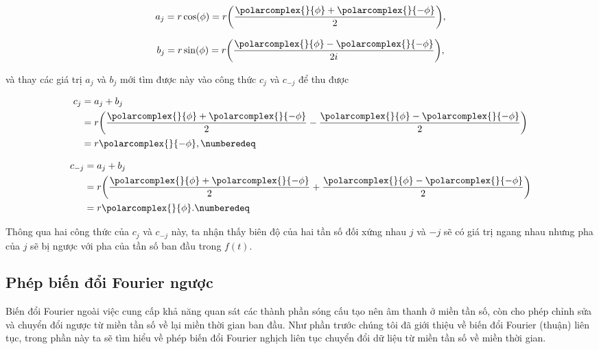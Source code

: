 			\begin{equation}
				a_j	= r \cos(\phi) = r \bigg( \frac{\polarcomplex{}{\phi} + \polarcomplex{}{- \phi}}{2} \bigg),
			\end{equation}
		
			\begin{equation}
				b_j = r \sin(\phi) = r \bigg( \frac{\polarcomplex{}{\phi} - \polarcomplex{}{- \phi}}{2i} \bigg),
			\end{equation}
		
		\noindent và thay các giá trị $a_j$ và $b_j$ mới tìm được này vào công thức $c_j$ và $c_{-j}$ để thu được
		
			\begin{align*}
				c_j	& = a_j + b_j \\
					& = r \bigg( \frac{\polarcomplex{}{\phi} + \polarcomplex{}{- \phi}}{2} - \frac{\polarcomplex{}{\phi} - \polarcomplex{}{- \phi}}{2} \bigg) \\
					& = r \polarcomplex{}{-\phi}, \numberedeq
			\end{align*}
		
			\begin{align*}
				c_{-j}	& = a_j + b_j \\
						& = r \bigg( \frac{\polarcomplex{}{\phi} + \polarcomplex{}{- \phi}}{2} + \frac{\polarcomplex{}{\phi} - \polarcomplex{}{- \phi}}{2} \bigg) \\
						& = r \polarcomplex{}{\phi}. \numberedeq
			\end{align*}
		
		Thông qua hai công thức của $c_j$ và $c_{-j}$ này, ta nhận thấy biên độ của hai tần số đối xứng nhau $j$ và $-j$ sẽ có giá trị ngang nhau nhưng pha của $j$ sẽ bị ngược với pha của tần số ban đầu trong $f(t)$.
		
		
	\subsection{Phép biến đổi Fourier ngược}\label{subsection::signal_processing::ifourier}
	
		Biến đổi Fourier ngoài việc cung cấp khả năng quan sát các thành phần sóng cấu tạo nên âm thanh ở miền tần số, còn cho phép chỉnh sửa và chuyển đổi ngược từ miền tần số về lại miền thời gian ban đầu. Như phần trước chúng tôi đã giới thiệu về biến đổi Fourier (thuận) liên tục, trong phần này ta sẽ tìm hiểu về phép biến đổi Fourier nghịch liên tục chuyển đổi dữ liệu từ miền tần số về miền thời gian.
		
		
